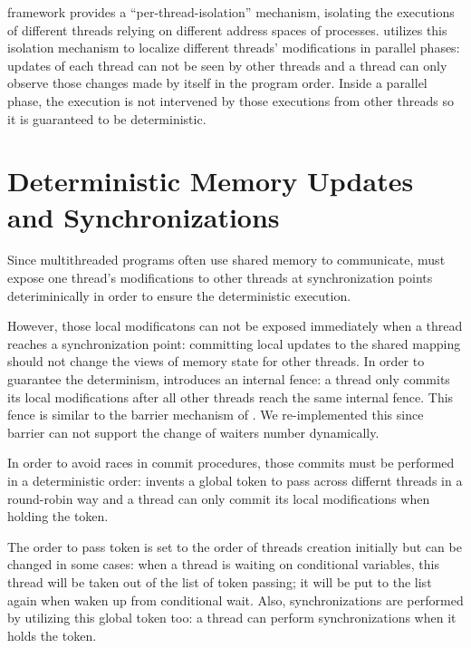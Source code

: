\Sheriff{} framework provides a ``per-thread-isolation'' mechanism, isolating the executions
of different threads relying on different address spaces of processes.
\dthreads{} utilizes this isolation mechanism to localize different threads' modifications in
parallel phases: 
updates of each thread can not be seen by other threads and a thread can only observe those 
changes made by itself in the program order. 
Inside a parallel phase, the execution is not intervened by those executions from other threads 
so it is guaranteed to be deterministic. 

\section{Deterministic Memory Updates and Synchronizations}
\label{sec:dthreadsdeterm}
Since multithreaded programs often use shared memory to communicate, 
\dthreads{} must expose one thread's modifications 
to other threads at synchronization points deteriminically in order to ensure 
the deterministic execution.
 
However, those local modificatons can not be exposed immediately when a thread reaches a 
synchronization point: committing local updates to the shared mapping should not
change the views of memory state for other threads. 
In order to guarantee the determinism, \dthreads{} introduces an internal fence: 
a thread only commits its local modifications after all other threads reach 
the same internal fence. 
This fence is similar to the barrier mechanism of \pthreads{}.  
We re-implemented this since
\pthreads{} barrier can not support the change of waiters number dynamically.

In order to avoid races in commit procedures, those commits must be performed in a 
deterministic order: 
\dthreads{} invents a global token to pass across differnt threads in a round-robin way  
and a thread can only commit its local modifications when holding the token.

The order to pass token is set to the order of threads creation initially but can be changed 
in some cases: 
when a thread is waiting on conditional variables, this thread will be taken out of the list 
of token passing; it will be put to the list again when waken up from conditional wait. 
Also, synchronizations are performed by utilizing this global token too: a thread can perform 
synchronizations when it holds the token. 

